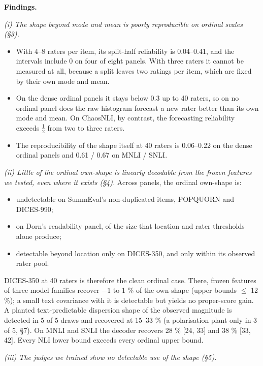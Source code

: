 \documentclass[10pt,twocolumn]{article}
\providecommand{\tightlist}{\setlength{\itemsep}{0pt}\setlength{\parskip}{0pt}}
\begin{document}
\textbf{Findings.}

\emph{(i) The shape beyond mode and mean is poorly reproducible on ordinal scales (\S{}3).}

\begin{itemize}
\tightlist
\item
  With 4--8 raters per item, its split-half reliability is 0.04--0.41, and the intervals include 0 on four of eight panels. With three raters it cannot be measured at all, because a split leaves two ratings per item, which are fixed by their own mode and mean.
\item
  On the dense ordinal panels it stays below 0.3 up to 40 raters, so on no ordinal panel does the raw histogram forecast a new rater better than its own mode and mean. On ChaosNLI, by contrast, the forecasting reliability exceeds $\tfrac12$ from two to three raters.
\item
  The reproducibility of the shape itself at 40 raters is 0.06--0.22 on the dense ordinal panels and 0.61 / 0.67 on MNLI / SNLI.
\end{itemize}

\emph{(ii) Little of the ordinal own-shape is linearly decodable from the frozen features we tested, even where it exists (\S{}4).} Across panels, the ordinal own-shape is:

\begin{itemize}
\tightlist
\item
  undetectable on SummEval's non-duplicated items, POPQUORN and DICES-990;
\item
  on Dorn's readability panel, of the size that location and rater thresholds alone produce;
\item
  detectable beyond location only on DICES-350, and only within its observed rater pool.
\end{itemize}

DICES-350 at 40 raters is therefore the clean ordinal case. There, frozen features of three model families recover $-$1 to 1 \% of the own-shape (upper bounds $\leq$ 12 \%); a small text covariance with it is detectable but yields no proper-score gain. A planted text-predictable dispersion shape of the observed magnitude is detected in 5 of 5 draws and recovered at 15--33 \% (a polarisation plant only in 3 of 5, \S{}7). On MNLI and SNLI the decoder recovers 28 \% {[}24, 33{]} and 38 \% {[}33, 42{]}. Every NLI lower bound exceeds every ordinal upper bound.

\emph{(iii) The judges we trained show no detectable use of the shape (\S{}5).}
\end{document}
